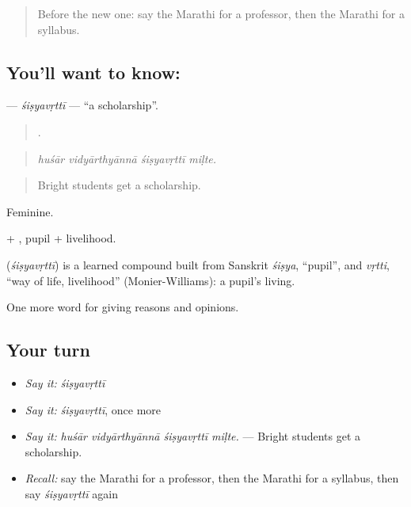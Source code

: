 \label{lesson:MR-C369-sisyavrtti}



\begin{quote}
Before the new one: say the Marathi for a professor, then the Marathi for a syllabus.
\end{quote}

\subsection*{You'll want to know: }
\textbf{} — \emph{śiṣyavṛttī} — \textquotedblleft{}a scholarship\textquotedblright{}.

\begin{quote}
   .
\end{quote}

\begin{quote}
\emph{huśār vidyārthyānnā śiṣyavṛttī miḷte.}
\end{quote}

\begin{quote}
Bright students get a scholarship.
\end{quote}

Feminine.

 + , pupil + livelihood.

\begin{cousinweb}
\textbf{} (\emph{śiṣyavṛttī}) is a learned compound built from Sanskrit \emph{śiṣya}, \textquotedblleft{}pupil\textquotedblright{}, and \emph{vṛtti}, \textquotedblleft{}way of life, livelihood\textquotedblright{} (Monier-Williams): a pupil's living.
\end{cousinweb}

\begin{grammarlens}[title={What you've built}]
One more word for giving reasons and opinions.
\end{grammarlens}

\subsection*{Your turn}
\begin{itemize}
\raggedright
  \item \emph{Say it:} \emph{śiṣyavṛttī}
  \item \emph{Say it:} \emph{śiṣyavṛttī}, once more
  \item \emph{Say it:} \emph{huśār vidyārthyānnā śiṣyavṛttī miḷte.} — Bright students get a scholarship.
  \item \emph{Recall:} say the Marathi for a professor, then the Marathi for a syllabus, then say \emph{śiṣyavṛttī} again
\end{itemize}

